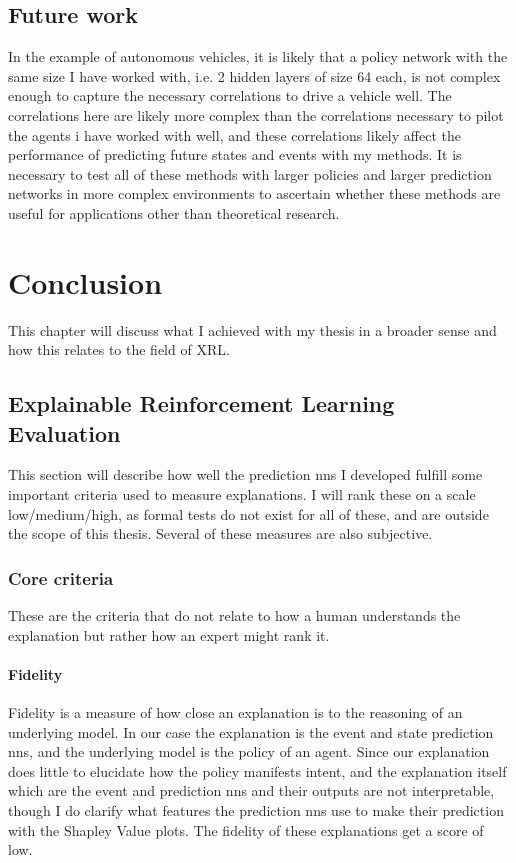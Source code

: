 \documentclass[UKenglish]{uiomasterthesis}
\begin{document}
\section{Future work}
In the example of autonomous vehicles, it is likely that a policy network with the same size I have worked with, i.e. 2 hidden layers of size 64 each, is not complex enough to capture the necessary correlations to drive a vehicle well. The correlations here are likely more complex than the correlations necessary to pilot the agents i have worked with well, and these correlations likely affect the performance of predicting future states and events with my methods. It is necessary to test all of these methods with larger policies and larger prediction networks in more complex environments to ascertain whether these methods are useful for applications other than theoretical research. 


\chapter{Conclusion}
This chapter will discuss what I achieved with my thesis in a broader sense and how this relates to the field of XRL.

\section{Explainable Reinforcement Learning Evaluation}
This section will describe how well the prediction \acp{nn} I developed fulfill some important criteria used to measure explanations. I will rank these on a scale low/medium/high, as formal tests do not exist for all of these, and are outside the scope of this thesis. Several of these measures are also subjective.

\subsection{Core criteria}
These are the criteria that do not relate to how a human understands the explanation but rather how an expert might rank it.

\subsubsection{Fidelity}
Fidelity is a measure of how close an explanation is to the reasoning of an underlying model. In our case the explanation is the event and state prediction \acp{nn}, and the underlying model is the policy of an agent. Since our explanation does little to elucidate how the policy manifests intent, and the explanation itself which are the event and prediction \acp{nn} and their outputs are not interpretable, though I do clarify what features the prediction \acp{nn} use to make their prediction with the Shapley Value plots. The fidelity of these explanations get a score of low.
\end{document}
